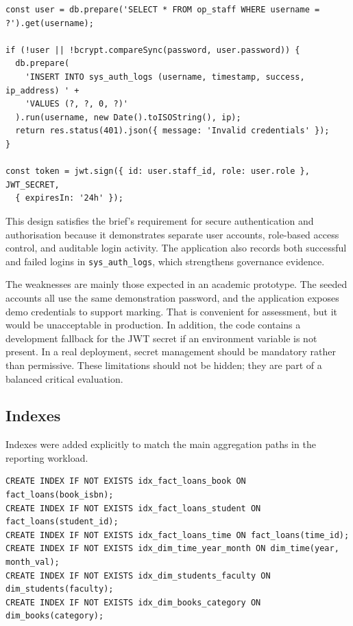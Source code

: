 \documentclass[12pt,a4paper]{article}
\begin{document}
\begin{lstlisting}[style=reportcode,caption={Authentication and RBAC evidence from server/routes.ts}]
const user = db.prepare('SELECT * FROM op_staff WHERE username = ?').get(username);

if (!user || !bcrypt.compareSync(password, user.password)) {
  db.prepare(
    'INSERT INTO sys_auth_logs (username, timestamp, success, ip_address) ' +
    'VALUES (?, ?, 0, ?)'
  ).run(username, new Date().toISOString(), ip);
  return res.status(401).json({ message: 'Invalid credentials' });
}

const token = jwt.sign({ id: user.staff_id, role: user.role }, JWT_SECRET,
  { expiresIn: '24h' });
\end{lstlisting}

This design satisfies the brief's requirement for secure authentication and authorisation because it demonstrates separate user accounts, role-based access control, and auditable login activity. The application also records both successful and failed logins in \texttt{sys\_auth\_logs}, which strengthens governance evidence.

The weaknesses are mainly those expected in an academic prototype. The seeded accounts all use the same demonstration password, and the application exposes demo credentials to support marking. That is convenient for assessment, but it would be unacceptable in production. In addition, the code contains a development fallback for the JWT secret if an environment variable is not present. In a real deployment, secret management should be mandatory rather than permissive. These limitations should not be hidden; they are part of a balanced critical evaluation.

\subsection{Indexes}
Indexes were added explicitly to match the main aggregation paths in the reporting workload.

\begin{lstlisting}[style=reportcode,caption={Index definitions from server/db.ts}]
CREATE INDEX IF NOT EXISTS idx_fact_loans_book ON fact_loans(book_isbn);
CREATE INDEX IF NOT EXISTS idx_fact_loans_student ON fact_loans(student_id);
CREATE INDEX IF NOT EXISTS idx_fact_loans_time ON fact_loans(time_id);
CREATE INDEX IF NOT EXISTS idx_dim_time_year_month ON dim_time(year, month_val);
CREATE INDEX IF NOT EXISTS idx_dim_students_faculty ON dim_students(faculty);
CREATE INDEX IF NOT EXISTS idx_dim_books_category ON dim_books(category);
\end{lstlisting}
\end{document}
